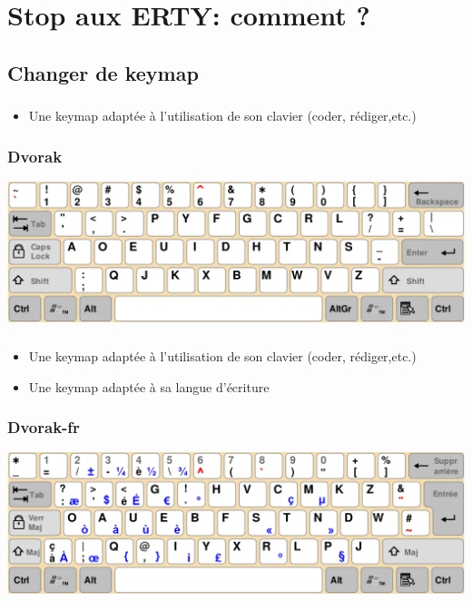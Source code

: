 \documentclass[c,12pt]{beamer}
\begin{document}
\section{Stop aux ERTY: comment ?}
\subsection{Changer de keymap}

\begin{frame}
	\frametitle{\subsecname}
	\begin{itemize}
		\item{Une keymap adaptée à l'utilisation de son clavier (coder,
			rédiger,etc.)}
	\end{itemize}
\end{frame}

\begin{frame}
	\frametitle{Dvorak}
	\begin{center}
		\includegraphics[scale=0.26]{Dvorak.png}
	\end{center}
\end{frame}

\begin{frame}
	\frametitle{\subsecname}
	\begin{itemize}
		\item<1->{Une keymap adaptée à l'utilisation de son clavier (coder,
			rédiger,etc.)}
		\item<2->{Une keymap adaptée à sa langue d'écriture}
	\end{itemize}
\end{frame}

\begin{frame}
	\frametitle{Dvorak-fr}
	\begin{center}
		\includegraphics[scale=0.26]{Dvorak-fr.png}
	\end{center}
\end{frame}
\end{document}
